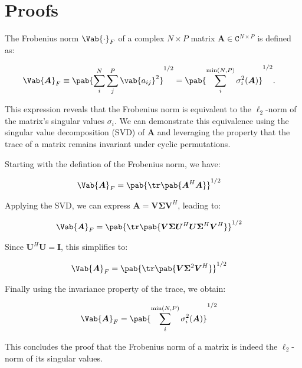 \chapter{Proofs} 

The Frobenius norm $\Vab{\cdot}_F$ of a complex $N\times P$ matrix $\bm{A} \in \mathtt{C}^{N \times P}$ is defined as:

\begin{align}\label{eq:app:frobenius_norm}
    \Vab{\bm{A}}_F &\equiv  \pab{\sum_i^N \sum_j^P \vab{a_{ij}}^2}^{1/2} = \pab{\sum_{i}^{\min(N, P)} \sigma_i^2(\bm{A})}^{1/2}.
\end{align}

This expression reveals that the Frobenius norm is equivalent to the $\ell_2$-norm of the matrix's singular values $\sigma_i$. We can demonstrate this equivalence using the singular value decomposition (SVD) of $\bm{A}$ and leveraging the property that the trace of a matrix remains invariant under cyclic permutations.

Starting with the defintion of the Frobenius norm, we have:

\begin{align*}
    \Vab{\bm{A}}_F &= \pab{\tr \pab{\bm{A}^H\bm{A}}}^{1/2}
\end{align*}

Applying the SVD, we can express $\bm{A} = \bm{V}\bm{\Sigma}\bm{V}^H$, leading to:

\begin{align*}
    \Vab{\bm{A}}_F &= \pab{\tr \pab{\bm{V}\bm{\Sigma}\bm{U}^H\bm{U}\bm{\Sigma}^H\bm{V}^H}}^{1/2}
\end{align*}

Since $\bm{U}^H\bm{U}=\bm{I}$, this simplifies to:

\begin{align*}
    \Vab{\bm{A}}_F &= \pab{\tr \pab{\bm{V}\bm{\Sigma}^2\bm{V}^H}}^{1/2}
\end{align*}


Finally using the invariance property of the trace, we obtain:

\begin{align*}
    \Vab{\bm{A}}_F &= \pab{\sum_{i}^{\min(N, P)} \sigma_i^2(\bm{A})}^{1/2}
\end{align*}

This concludes the proof that the Frobenius norm of a matrix is indeed the $\ell_2$-norm of its singular values.


